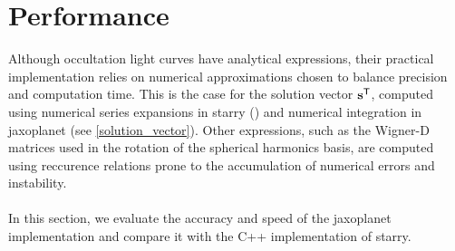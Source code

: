 \documentclass[modern]{aastex631}
\begin{document}
\section{Performance}\label{performance}
Although occultation light curves have analytical expressions, their practical implementation relies on numerical approximations chosen to balance precision and computation time. This is the case for the solution vector ${\mathbf{s}}^\mathsf{T}$, computed using numerical series expansions in \textsf{starry} (\citealt[section D.2.3]{starry}) and numerical integration in \textsf{jaxoplanet} (see \autoref{solution_vector}). Other expressions, such as the Wigner-D matrices used in the rotation of the spherical harmonics basis, are computed using reccurence relations prone to the accumulation of numerical errors and instability.\\\\
In this section, we evaluate the accuracy and speed of the \textsf{jaxoplanet} implementation and compare it with the C++ implementation of \textsf{starry}.
\end{document}
